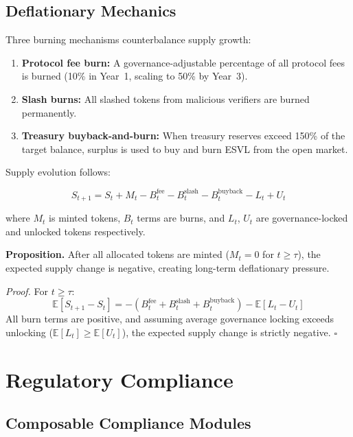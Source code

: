 \documentclass[11pt,a4paper]{article}
\begin{document}
\subsection{Deflationary Mechanics}

Three burning mechanisms counterbalance supply growth:

\begin{enumerate}[nosep]
    \item \textbf{Protocol fee burn:} A governance-adjustable percentage of all protocol fees is burned (10\% in Year~1, scaling to 50\% by Year~3).
    \item \textbf{Slash burns:} All slashed tokens from malicious verifiers are burned permanently.
    \item \textbf{Treasury buyback-and-burn:} When treasury reserves exceed 150\% of the target balance, surplus is used to buy and burn ESVL from the open market.
\end{enumerate}

Supply evolution follows:

\begin{equation}
    S_{t+1} = S_t + M_t - B_t^{\text{fee}} - B_t^{\text{slash}} - B_t^{\text{buyback}} - L_t + U_t
\end{equation}

\noindent where $M_t$ is minted tokens, $B_t$ terms are burns, and $L_t$, $U_t$ are governance-locked and unlocked tokens respectively.

\textbf{Proposition.} After all allocated tokens are minted ($M_t = 0$ for $t \geq \tau$), the expected supply change is negative, creating long-term deflationary pressure.

\textit{Proof.} For $t \geq \tau$:
\[
    \mathbb{E}[S_{t+1} - S_t] = -(B_t^{\text{fee}} + B_t^{\text{slash}} + B_t^{\text{buyback}}) - \mathbb{E}[L_t - U_t]
\]
All burn terms are positive, and assuming average governance locking exceeds unlocking ($\mathbb{E}[L_t] \geq \mathbb{E}[U_t]$), the expected supply change is strictly negative. \hfill$\square$

\section{Regulatory Compliance}
\label{sec:compliance}

\subsection{Composable Compliance Modules}
\end{document}
